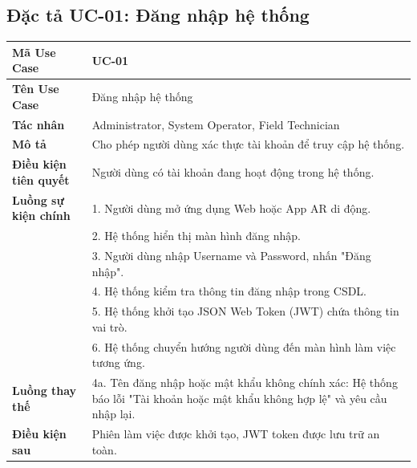 \subsection{Đặc tả UC-01: Đăng nhập hệ thống}
\begin{table}[H]
\centering
\begin{tabular}{|p{4cm}|p{10.5cm}|}
\hline
\textbf{Mã Use Case} & \textbf{UC-01} \\ \hline
\textbf{Tên Use Case} & Đăng nhập hệ thống \\ \hline
\textbf{Tác nhân} & Administrator, System Operator, Field Technician \\ \hline
\textbf{Mô tả} & Cho phép người dùng xác thực tài khoản để truy cập hệ thống. \\ \hline
\textbf{Điều kiện tiên quyết} & Người dùng có tài khoản đang hoạt động trong hệ thống. \\ \hline
\textbf{Luồng sự kiện chính} & 
1. Người dùng mở ứng dụng Web hoặc App AR di động.\\ 
& 2. Hệ thống hiển thị màn hình đăng nhập.\\ 
& 3. Người dùng nhập Username và Password, nhấn "Đăng nhập".\\ 
& 4. Hệ thống kiểm tra thông tin đăng nhập trong CSDL.\\ 
& 5. Hệ thống khởi tạo JSON Web Token (JWT) chứa thông tin vai trò.\\ 
& 6. Hệ thống chuyển hướng người dùng đến màn hình làm việc tương ứng. \\ \hline
\textbf{Luồng thay thế} & 4a. Tên đăng nhập hoặc mật khẩu không chính xác: Hệ thống báo lỗi "Tài khoản hoặc mật khẩu không hợp lệ" và yêu cầu nhập lại. \\ \hline
\textbf{Điều kiện sau} & Phiên làm việc được khởi tạo, JWT token được lưu trữ an toàn. \\ \hline
\end{tabular}
\end{table}

